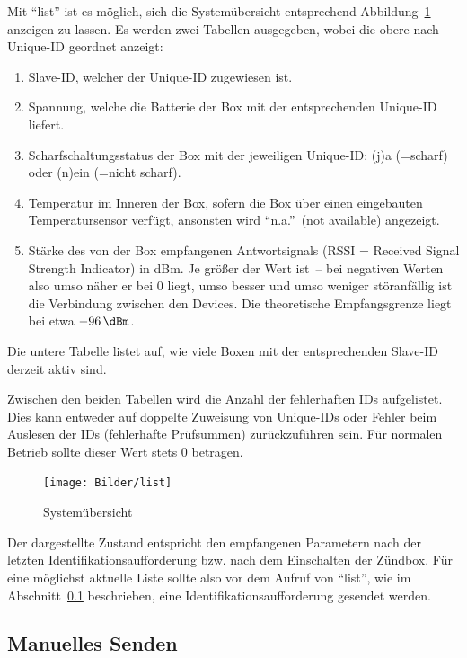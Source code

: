 \documentclass[paper=a4, parskip, numbers=noenddot, toc=listof, headsepline]{scrbook}
\begin{document}
				Mit \enquote{list} ist es möglich, sich die Systemübersicht entsprechend Abbildung~\ref{fig:list} anzeigen zu lassen. Es werden zwei Tabellen ausgegeben, wobei die obere nach Unique-ID geordnet anzeigt:
				\begin{enumerate}
					\item
					      Slave-ID, welcher der Unique-ID zugewiesen ist.
					\item
					      Spannung, welche die Batterie der Box mit der entsprechenden Unique-ID liefert.
					\item
					      Scharfschaltungsstatus der Box mit der jeweiligen Unique-ID: (j)a (=scharf) oder (n)ein (=nicht scharf).
					\item
					      Temperatur im Inneren der Box, sofern die Box über einen eingebauten Temperatursensor verfügt, ansonsten wird \enquote{n.a.}~(not available) angezeigt.
					\item
					      Stärke des von der Box empfangenen Antwortsignals (RSSI = Received Signal Strength Indicator) in dBm. Je größer der Wert ist~-- bei negativen Werten also umso näher er bei 0 liegt, umso besser und umso weniger störanfällig ist die Verbindung zwischen den Devices. Die theoretische Empfangsgrenze liegt bei etwa $\SI{-96}{\dBm}$.
				\end{enumerate}

				Die untere Tabelle listet auf, wie viele Boxen mit der entsprechenden Slave-ID derzeit aktiv sind.

				Zwischen den beiden Tabellen wird die Anzahl der fehlerhaften IDs aufgelistet. Dies kann entweder auf doppelte Zuweisung von Unique-IDs oder Fehler beim Auslesen der IDs (fehlerhafte Prüfsummen) zurückzuführen sein. Für normalen Betrieb sollte dieser Wert stets 0 betragen.

				\begin{figure}
					\centering
					\texttt{[image: Bilder/list]}
					\caption{Systemübersicht}
					\label{fig:list}
				\end{figure}

				Der dargestellte Zustand entspricht den empfangenen Parametern nach der letzten Identifikationsaufforderung bzw. nach dem Einschalten der Zündbox. Für eine möglichst aktuelle Liste sollte also vor dem Aufruf von \enquote{list}, wie im Abschnitt~\ref{sec:manuellessenden} beschrieben, eine Identifikationsaufforderung gesendet werden.

			\subsection{Manuelles Senden}
				\label{sec:manuellessenden}
\end{document}
